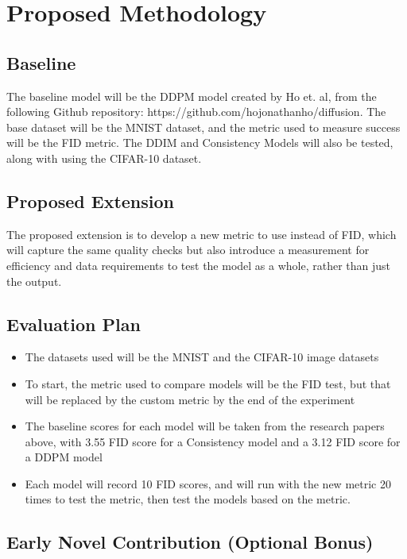 \documentclass[11pt, letterpaper]{article}
\begin{document}
\section{Proposed Methodology}

\subsection{Baseline}

The baseline model will be the DDPM model created by Ho et. al, from the following Github repository: https://github.com/hojonathanho/diffusion. The base dataset will be the MNIST dataset, and the metric used to measure success will be the FID metric. The DDIM and Consistency Models will also be tested, along with using the CIFAR-10 dataset.

\subsection{Proposed Extension}

The proposed extension is to develop a new metric to use instead of FID, which will capture the same quality checks but also introduce a measurement for efficiency and data requirements to test the model as a whole, rather than just the output.

\subsection{Evaluation Plan}

\begin{itemize}[noitemsep]
  \item The datasets used will be the MNIST and the CIFAR-10 image datasets
  \item To start, the metric used to compare models will be the FID test, but that will be replaced by the custom metric by the end of the experiment
  \item The baseline scores for each model will be taken from the research papers above, with 3.55 FID score for a Consistency model and a 3.12 FID score for a DDPM model
  \item Each model will record 10 FID scores, and will run with the new metric 20 times to test the metric, then test the models based on the metric.
\end{itemize}

\subsection{Early Novel Contribution (Optional Bonus)}
\end{document}
